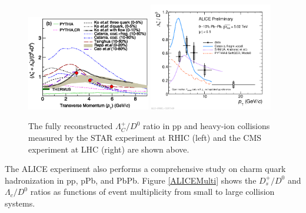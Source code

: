 \begin{figure}[hbtp]
\begin{center}
\includegraphics[width=0.48\textwidth]{Figures/Chapter2/STARLambdaCD0.png}
\includegraphics[width=0.48\textwidth]{Figures/Chapter2/ALICELambdaCD0}
\caption{The fully reconstructed $\Lambda_C^+/D^0$ ratio in pp and heavy-ion collisions measured by the STAR experiment at RHIC (left) and the CMS experiment at LHC (right) are shown above.}
\label{HadroPlotCharm}
\end{center}
\end{figure}   



The ALICE experiment also performs a comprehensive study on charm quark hadronization in pp, pPb, and PbPb. Figure \ref{ALICEMulti} shows the $D^+_s/D^0$ and $\Lambda_c/D^0$  ratios as functions of event multiplicity from small to large collision systems. 

